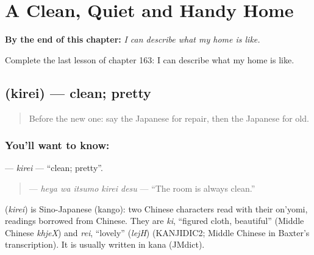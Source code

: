 
\chapter{A Clean, Quiet and Handy Home}
\label{ch:ja-a-clean-quiet-and-handy-home}

\begin{chapteropening}
\textbf{By the end of this chapter:} \emph{I can describe what my home is like.}

Complete the last lesson of chapter 163: I can describe what my home is like.
\end{chapteropening}

\section[\texorpdfstring{\ja{きれい} (kirei)}{きれい (kirei)}]{ (kirei) — clean; pretty}

\label{lesson:JA-C163-kirei}



\begin{quote}
Before the new one: say the Japanese for repair, then the Japanese for old.
\end{quote}

\subsection*{You'll want to know: }
\textbf{} — \emph{kirei} — \textquotedblleft{}clean; pretty\textquotedblright{}.

\begin{quote}
\textbf{  } — \emph{heya wa itsumo kirei desu} — \textquotedblleft{}The room is always clean.\textquotedblright{}
\end{quote}

\begin{cousinweb}
\textbf{} (\emph{kirei}) is Sino-Japanese (kango): two Chinese characters read with their on'yomi, readings borrowed from Chinese. They are \emph{ki}, \textquotedblleft{}figured cloth, beautiful\textquotedblright{} (Middle Chinese \emph{khjeX}) and \emph{rei}, \textquotedblleft{}lovely\textquotedblright{} (\emph{lejH}) (KANJIDIC2; Middle Chinese in Baxter's transcription). It is usually written in kana (JMdict).
\end{cousinweb}

